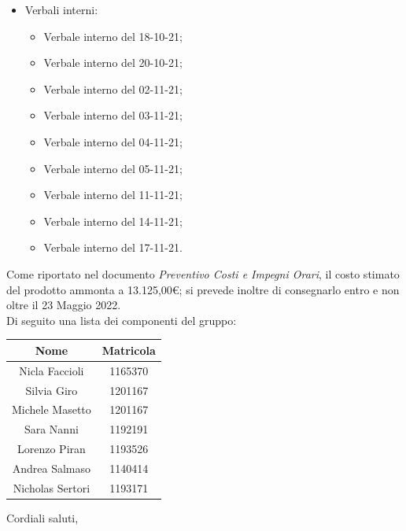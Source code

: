\documentclass[11pt]{letter}
\begin{document}
\begin{letter}{}
\begin{itemize}
\begin{itemize}
			\end{itemize}
			\item Verbali interni:
			\begin{itemize}
				\item Verbale interno del 18-10-21;
				\item Verbale interno del 20-10-21;
				\item Verbale interno del 02-11-21;
				\item Verbale interno del 03-11-21;
				\item Verbale interno del 04-11-21;
				\item Verbale interno del 05-11-21;
				\item Verbale interno del 11-11-21;
				\item Verbale interno del 14-11-21;
				\item Verbale interno del 17-11-21.
			\end{itemize}
		\end{itemize}
		Come riportato nel documento \textit{Preventivo Costi e Impegni Orari}, il costo stimato del prodotto ammonta a 13.125,00\euro;
		si prevede inoltre di consegnarlo entro e non oltre il 23 Maggio 2022. \\
		Di seguito una lista dei componenti del gruppo: \\
		\begin{center}
			\begin{tabular}{ c | c }
				\textbf{Nome} & \textbf{Matricola} \\
				\hline Nicla Faccioli & 1165370 \\
				Silvia Giro & 1201167 \\
				Michele Masetto & 1201167 \\
				Sara Nanni & 1192191 \\
				Lorenzo Piran & 1193526 \\
				Andrea Salmaso & 1140414 \\
				Nicholas Sertori & 1193171 \\		
			\end{tabular}
		\end{center}
		\closing{Cordiali saluti,}
	\end{letter}
\end{document}
